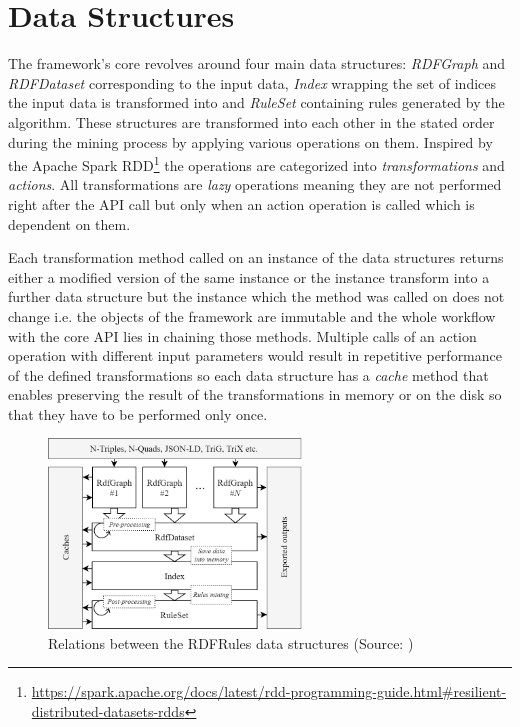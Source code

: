 \section{Data Structures}

The framework's core revolves around four main data structures: \textit{RDFGraph} and \textit{RDFDataset} corresponding to the input data, \textit{Index} wrapping the set of indices the input data is transformed into and \textit{RuleSet} containing rules generated by the algorithm. These structures are transformed into each other in the stated order during the mining process by applying various operations on them. Inspired by the Apache Spark RDD\footnote{\href{https://spark.apache.org/docs/latest/rdd-programming-guide.html\#resilient-distributed-datasets-rdds}{https://spark.apache.org/docs/latest/rdd-programming-guide.html\#resilient-distributed-datasets-rdds}} the operations are categorized into \textit{transformations} and \textit{actions}. All transformations are \textit{lazy} operations meaning they are not performed right after the API call but only when an action operation is called which is dependent on them.

Each transformation method called on an instance of the data structures returns either a modified version of the same instance or the instance transform into a further data structure but the instance which the method was called on does not change i.e. the objects of the framework are immutable and the whole workflow with the core API lies in chaining those methods. Multiple calls of an action operation with different input parameters would result in repetitive performance of the defined transformations so each data structure has a \textit{cache} method that enables preserving the result of the transformations in memory or on the disk so that they have to be performed only once.

\begin{figure}[h]
\centering
\includegraphics[width=0.6\textwidth]{img/rdfrules-abstractions.png}
\caption{Relations between the RDFRules data structures (Source: \cite{Zeman2018})}
\label{rdfrulesdatastructures}
\end{figure}

